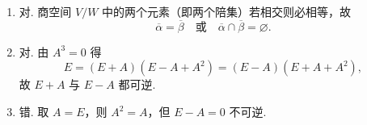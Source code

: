 \begin{enumerate}
\begin{enumerate}
        \item 对. 商空间 $V/W$ 中的两个元素（即两个陪集）若相交则必相等，故
        \[
            \overline{\alpha}=\overline{\beta}
            \quad\text{或}\quad
            \overline{\alpha}\cap\overline{\beta}=\varnothing.
        \]

        \item 对. 由 $A^3=0$ 得
        \[
            E=(E+A)(E-A+A^2)=(E-A)(E+A+A^2),
        \]
        故 $E+A$ 与 $E-A$ 都可逆.

        \item 错. 取 $A=E$，则 $A^2=A$，但 $E-A=0$ 不可逆.
    \end{enumerate}
\end{enumerate}

\clearpage
